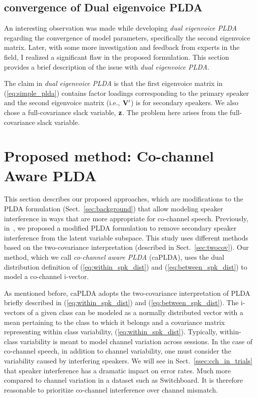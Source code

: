 \subsection{convergence of Dual eigenvoice PLDA}
\label{ssec:convergence_dualevplda}
An interesting observation was made while developing {\it dual eigenvoice PLDA} regarding the convergence of model parameters, specifically the second eigenvoice matrix. 
Later, with some more investigation and feedback from experts in the field, I realized a significant flaw in the proposed formulation. 
This section provides a brief description of the issue with {\it dual eigenvoice PLDA}. 

The claim in {\it dual eigenvoice PLDA} is that the first eigenvoice matrix in (\ref{eq:simple_plda}) contains factor loadings corresponding to the primary speaker and the second eigenvoice matrix (i.e., ${\bf V}^\prime$) is for secondary speakers. 
We also chose a full-covariance slack variable, ${\bf z}$. 
The problem here arises from the full-covariance slack variable. 


\section{Proposed method: Co-channel Aware PLDA}
\label{sec:cch_plda}
This section describes our proposed approaches, which are modifications to the PLDA formulation (Sect.~\ref{sec:background}) that allow modeling speaker interference in ways that are more appropriate for co-channel speech. 
Previously, in~\cite{shokouhi2015probabilistic}, we proposed a modified PLDA formulation to remove secondary speaker interference from the latent variable subspace. 
This study uses different methods based on the two-covariance interpretation (described in Sect.~\ref{sec:twocov}). 
Our method, which we call {\it co-channel aware PLDA} (caPLDA), uses the dual distribution definition of (\ref{eq:within_spk_dist}) and (\ref{eq:between_spk_dist}) to model a co-channel i-vector. 

As mentioned before, caPLDA adopts the two-covariance interpretation of PLDA briefly described in (\ref{eq:within_spk_dist}) and (\ref{eq:between_spk_dist}). 
The i-vectors of a given class can be modeled as a normally distributed vector with a mean pertaining to the class to which it belongs and a covariance matrix representing within class variability, (\ref{eq:within_spk_dist}). 
Typically, within-class variability is meant to model channel variation across sessions. 
In the case of co-channel speech, in addition to channel variability, one must consider the variability caused by interfering speakers. 
We will see in Sect.~\ref{ssec:cch_in_trials} that speaker interference has a dramatic impact on error rates. Much more compared to channel variation in a dataset such as Switchboard. 
It is therefore reasonable to prioritize co-channel interference over channel mismatch. 

